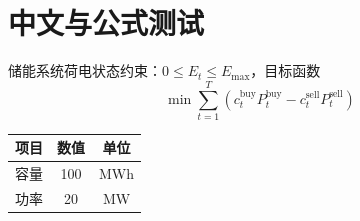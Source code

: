 \documentclass[12pt]{ctexart}
\begin{document}
\section{中文与公式测试}
储能系统荷电状态约束：$0 \le E_t \le E_{\max}$，目标函数
\begin{equation}
\min \sum_{t=1}^{T}\left(c_t^{\text{buy}}P_t^{\text{buy}} - c_t^{\text{sell}}P_t^{\text{sell}}\right)
\end{equation}
\begin{table}[h]\centering
\begin{tabular}{lcc}\toprule
项目 & 数值 & 单位 \\ \midrule
容量 & 100 & MWh \\
功率 & 20 & MW \\ \bottomrule
\end{tabular}
\end{table}
\end{document}
